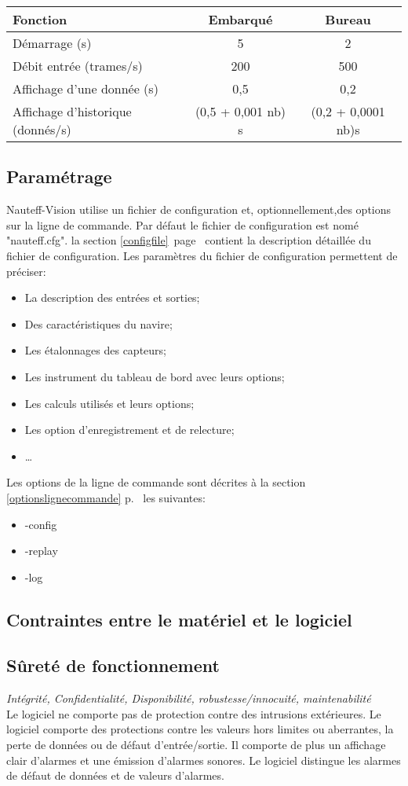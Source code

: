 \documentclass[a4paper,11pt]{report}
\newcommand{\myref}[1]{\ref{#1} p.\ \pageref{#1}}
\begin{document}
\begin{tabular}{|l|c|c|}
	\hline
	Fonction & Embarqué &  Bureau\\
	\hline
	Démarrage (s) & 5 & 2 \\
	\hline
	Débit entrée (trames/s) & 200  &  500 \\
	\hline
    Affichage d'une donnée (s) & 0,5 &  0,2\\
	\hline
	Affichage d'historique (donnés/s)& (0,5 + 0,001 nb) s &  (0,2 + 0,0001 nb)s\\
	\hline
\end{tabular}

\subsection{Paramétrage}

Nauteff-Vision utilise un fichier de configuration et,
optionnellement,des options sur la ligne de commande.
Par défaut le fichier de configuration est nomé "nauteff.cfg". 
la section \ref{configfile}\ page\ \pageref{configfile} contient la description détaillée
du fichier de configuration.
Les paramètres du fichier de configuration permettent de préciser:
\begin{itemize}
    \item La description des entrées et sorties;
    \item Des caractéristiques du navire;
    \item Les étalonnages des capteurs;
    \item Les instrument du tableau de bord avec leurs options;
    \item Les calculs utilisés et leurs options;
    \item Les option d'enregistrement et de relecture;
    \item \dots
\end{itemize}
Les options de la ligne de commande sont décrites à la section \myref{optionslignecommande}
les suivantes:
\begin{itemize}
  \item[] -config
  \item[] -replay
  \item[] -log
\end{itemize}

\subsection{Contraintes entre le matériel et le logiciel}
\subsection{Sûreté de fonctionnement}
\textit{Intégrité, Confidentialité, Disponibilité, robustesse/innocuité, maintenabilité}
\\
Le logiciel ne comporte pas de protection contre des intrusions extérieures.
Le logiciel comporte des protections contre
les valeurs hors limites ou aberrantes,
la perte de données ou de défaut d'entrée/sortie.
Il comporte de plus un affichage clair d'alarmes et une émission d'alarmes sonores.
Le logiciel distingue les alarmes de défaut de données et de valeurs d'alarmes.
\end{document}
